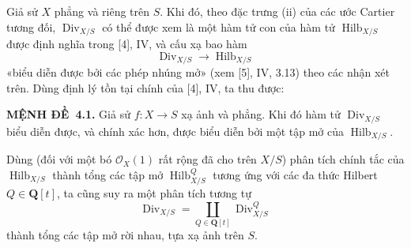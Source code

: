 \documentclass[11pt,twoside,openany]{book}
\numberwithin{equation}{section}
\newcommand{\src}[1]{%
  \phantomsection\hypertarget{src:\fgasourceid:#1}{}%
  \marginpar{\raggedleft\footnotesize\sffamily #1}%
}
\newcommand{\fgasourceid}{unset}
\newcommand{\result}[2]{\par\medskip\noindent\textbf{#1\if\relax\detokenize{#2}\relax\else\ #2\fi.}\quad}
\begin{document}
Giả sử $X$ phẳng và riêng trên $S$. Khi đó, theo đặc trưng (ii) của các ước
Cartier tương đối, $\operatorname{Div}_{X/S}$ có thể được xem là một hàm tử
con của hàm tử $\operatorname{Hilb}_{X/S}$ được định nghĩa trong [4], IV, và
cấu xạ bao hàm
\[
\operatorname{Div}_{X/S}\longrightarrow\operatorname{Hilb}_{X/S}
\]
«biểu diễn được bởi các phép nhúng mở» (xem [5], IV, 3.13) theo các nhận xét
trên. Dùng định lý tồn tại chính của [4], IV, ta thu được:
\src{152}
\result{MỆNH ĐỀ}{4.1} Giả sử $f:X\longrightarrow S$ xạ ảnh và phẳng. Khi đó
hàm tử $\operatorname{Div}_{X/S}$ biểu diễn được, và chính xác hơn, được biểu
diễn bởi một tập mở của $\operatorname{Hilb}_{X/S}$.

Dùng (đối với một bó $\mathcal O_X(1)$ rất rộng đã cho trên $X/S$) phân tích
chính tắc của $\operatorname{Hilb}_{X/S}$ thành tổng các tập mở
$\operatorname{Hilb}^{Q}_{X/S}$ tương ứng với các đa thức Hilbert
$Q\in\mathbf Q[t]$, ta cũng suy ra một phân tích tương tự
\[
\operatorname{Div}_{X/S}=
\coprod_{Q\in\mathbf Q[t]}\operatorname{Div}^{Q}_{X/S}
\]
thành tổng các tập mở rời nhau, tựa xạ ảnh trên $S$.
\end{document}
